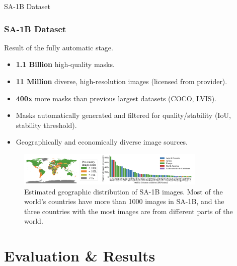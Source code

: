 \documentclass{beamer}
\begin{document}
\begin{frame}{SA-1B Dataset}
    \frametitle{SA-1B Dataset}
    Result of the fully automatic stage.
    \begin{itemize}
        \item \textbf{1.1 Billion} high-quality masks.
        \item \textbf{11 Million} diverse, high-resolution images (licensed from provider).
        \item \textbf{400x} more masks than previous largest datasets (COCO, LVIS).
        \item Masks automatically generated and filtered for quality/stability (IoU, stability threshold).
        \item Geographically and economically diverse image sources.
    \end{itemize}
    \begin{figure}
        \centering
        \includegraphics[width=0.8\textwidth]{figures/source_geography.png}
        \caption{\tiny Estimated geographic distribution of SA-1B images. Most of the world's countries have more than 1000 images in
        SA-1B, and the three countries with the most images are from different parts of the world.}
        \label{fig:source_geography}
    \end{figure}
\end{frame}

\section{Evaluation \& Results}
\end{document}
